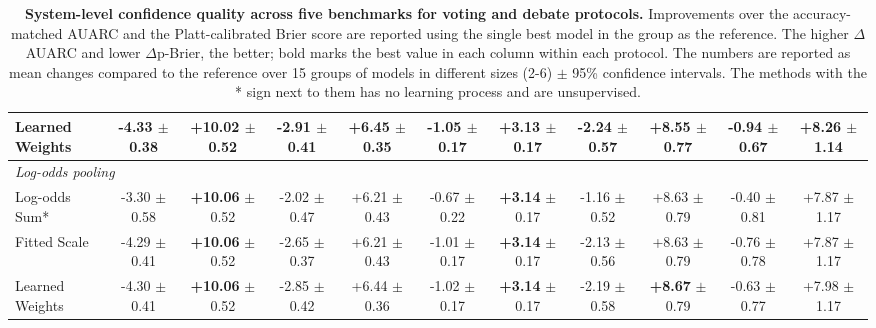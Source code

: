 \begin{table}[t]
\begin{threeparttable}
{\begin{tabular}{lcc|cc|cc|cc|cc}
Learned Weights & \textbf{-4.33} {\scriptsize $\pm$ 0.38} & +10.02 {\scriptsize $\pm$ 0.52} & \textbf{-2.91} {\scriptsize $\pm$ 0.41} & \textbf{+6.45} {\scriptsize $\pm$ 0.35} & \textbf{-1.05} {\scriptsize $\pm$ 0.17} & +3.13 {\scriptsize $\pm$ 0.17} & \textbf{-2.24} {\scriptsize $\pm$ 0.57} & +8.55 {\scriptsize $\pm$ 0.77} & \textbf{-0.94} {\scriptsize $\pm$ 0.67} & \textbf{+8.26} {\scriptsize $\pm$ 1.14} \\
\midrule
\multicolumn{11}{l}{\textit{Log-odds pooling}}\\
Log-odds Sum* & -3.30 {\scriptsize $\pm$ 0.58} & \textbf{+10.06} {\scriptsize $\pm$ 0.52} & -2.02 {\scriptsize $\pm$ 0.47} & +6.21 {\scriptsize $\pm$ 0.43} & -0.67 {\scriptsize $\pm$ 0.22} & \textbf{+3.14} {\scriptsize $\pm$ 0.17} & -1.16 {\scriptsize $\pm$ 0.52} & +8.63 {\scriptsize $\pm$ 0.79} & -0.40 {\scriptsize $\pm$ 0.81} & +7.87 {\scriptsize $\pm$ 1.17} \\
Fitted Scale & -4.29 {\scriptsize $\pm$ 0.41} & \textbf{+10.06} {\scriptsize $\pm$ 0.52} & -2.65 {\scriptsize $\pm$ 0.37} & +6.21 {\scriptsize $\pm$ 0.43} & -1.01 {\scriptsize $\pm$ 0.17} & \textbf{+3.14} {\scriptsize $\pm$ 0.17} & -2.13 {\scriptsize $\pm$ 0.56} & +8.63 {\scriptsize $\pm$ 0.79} & -0.76 {\scriptsize $\pm$ 0.78} & +7.87 {\scriptsize $\pm$ 1.17} \\
Learned Weights & -4.30 {\scriptsize $\pm$ 0.41} & \textbf{+10.06} {\scriptsize $\pm$ 0.52} & -2.85 {\scriptsize $\pm$ 0.42} & +6.44 {\scriptsize $\pm$ 0.36} & -1.02 {\scriptsize $\pm$ 0.17} & \textbf{+3.14} {\scriptsize $\pm$ 0.17} & -2.19 {\scriptsize $\pm$ 0.58} & \textbf{+8.67} {\scriptsize $\pm$ 0.79} & -0.63 {\scriptsize $\pm$ 0.77} & +7.98 {\scriptsize $\pm$ 1.17} \\

\bottomrule
\end{tabular}
}
\caption{\textbf{System-level confidence quality across five benchmarks for voting and debate protocols.} Improvements over the accuracy-matched AUARC and the Platt-calibrated Brier score are reported using the single best model in the group as the reference. The higher $\Delta$AUARC and lower $\Delta$p-Brier, the better; bold marks the best value in each column within each protocol. The numbers are reported as mean changes compared to the reference over 15 groups of models in different sizes (2-6) $\pm$ 95\% confidence intervals. The methods with the * sign next to them has no learning process and are unsupervised.}

\label{tab:results_main}
\end{threeparttable}
\end{table}